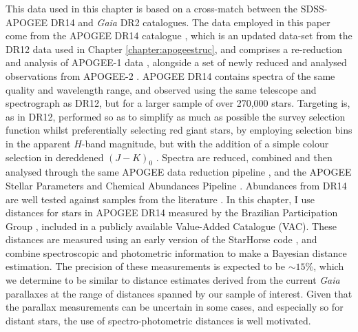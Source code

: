 This data used in this chapter is based on a cross-match between the SDSS-APOGEE DR14
and \emph{Gaia} DR2 catalogues. The data employed in
this paper come from the APOGEE DR14 catalogue \citep{2018ApJS..235...42A}, which is an updated data-set from the DR12 data used in Chapter \ref{chapter:apogeestruc},
and comprises a re-reduction and analysis of APOGEE-1 data
\citep[from SDSS-III,][]{2011AJ....142...72E}, alongside a set of
newly reduced and analysed observations from APOGEE-2 \citep[taken
as part of SDSS-IV,][]{2017AJ....154...28B}.  APOGEE DR14 contains
spectra of the same quality and wavelength range, and observed using the same telescope and spectrograph as DR12, but for a larger sample of over 270,000
stars. Targeting is, as in DR12, performed
so as to simplify as much as possible the survey selection function
whilst preferentially selecting red giant stars, by employing
selection bins in the apparent $H$-band magnitude, but with the addition of a simple
colour selection in dereddened $(J-K)_0$
\citep{2013AJ....146...81Z,2017AJ....154..198Z}. Spectra are reduced,
combined and then analysed through the same APOGEE data reduction pipeline
\citep{2015AJ....150..173N}, and the APOGEE Stellar Parameters and
Chemical Abundances Pipeline \citep[ASPCAP,][]{2016AJ....151..144G}. Abundances from DR14 are well tested against
samples from the literature \citep[][in press.]{jonssondr14}.  In this chapter, I
use distances for stars in APOGEE DR14 measured by the Brazilian
Participation Group \citep[BPG,][]{2016A&A...585A..42S}, included
in a publicly available Value-Added Catalogue (VAC). These distances
are measured using an early version of the StarHorse code
\citep{2018MNRAS.476.2556Q}, and combine spectroscopic and photometric
information to make a Bayesian distance estimation. The precision
of these measurements is expected to be $\sim 15 \%$, which we
determine to be similar to distance estimates derived from the
current \emph{Gaia} parallaxes at the range of distances spanned
by our sample of interest.  Given that the parallax measurements
can be uncertain in some cases, and especially so for distant stars,
the use of spectro-photometric distances is well motivated.


